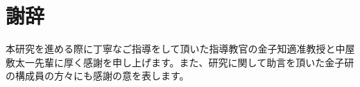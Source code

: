 \chapter*{謝辞}

本研究を進める際に丁寧なご指導をして頂いた指導教官の金子知適准教授と中屋敷太一先輩に厚く感謝を申し上げます。また、研究に関して助言を頂いた金子研の構成員の方々にも感謝の意を表します。